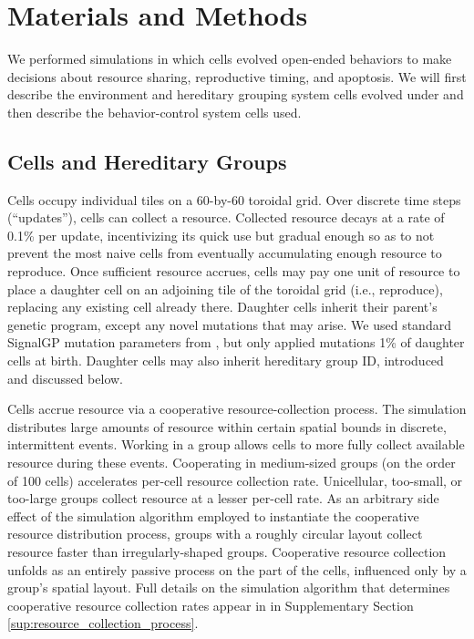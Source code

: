 \section{Materials and Methods}



We performed simulations in which cells evolved open-ended behaviors to make decisions about resource sharing, reproductive timing, and apoptosis.
We will first describe the environment and hereditary grouping system cells evolved under and then describe the behavior-control system cells used.

\subsection{Cells and Hereditary Groups}

Cells occupy individual tiles on a 60-by-60 toroidal grid.
Over discrete time steps (``updates''), cells can collect a resource.
Collected resource decays at a rate of 0.1\% per update, incentivizing its quick use but gradual enough so as to not prevent the most naive cells from eventually accumulating enough resource to reproduce.
Once sufficient resource accrues, cells may pay one unit of resource to place a daughter cell on an adjoining tile of the toroidal grid (i.e., reproduce), replacing any existing cell already there.
Daughter cells inherit their parent's genetic program, except any novel mutations that may arise.
We used standard SignalGP mutation parameters from \citep{lalejini2018evolving}, but only applied mutations 1\% of daughter cells at birth.
Daughter cells may also inherit hereditary group ID, introduced and discussed below.

Cells accrue resource via a cooperative resource-collection process.
The simulation distributes large amounts of resource within certain spatial bounds in discrete, intermittent events.
Working in a group allows cells to more fully collect available resource during these events.
Cooperating in medium-sized groups (on the order of 100 cells) accelerates per-cell resource collection rate.
Unicellular, too-small, or too-large groups collect resource at a lesser per-cell rate.
As an arbitrary side effect of the simulation algorithm employed to instantiate the cooperative resource distribution process, groups with a roughly circular layout collect resource faster than irregularly-shaped groups.
Cooperative resource collection unfolds as an entirely passive process on the part of the cells, influenced only by a group's spatial layout.
Full details on the simulation algorithm that determines cooperative resource collection rates appear in in Supplementary Section \ref{sup:resource_collection_process}.

